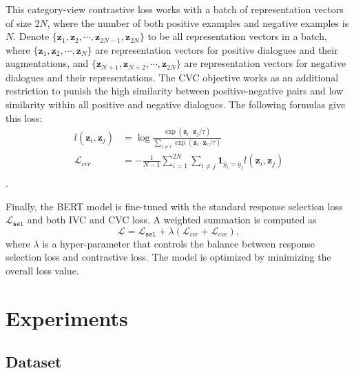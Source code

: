 \documentclass[letterpaper]{article} \usepackage{aaai22}  \usepackage{times}  \usepackage{helvet}  \usepackage{courier}  \usepackage[hyphens]{url}  \usepackage{graphicx} \urlstyle{rm} \def\UrlFont{\rm}  \usepackage{natbib}  \usepackage{caption} \DeclareCaptionStyle{ruled}{labelfont=normalfont,labelsep=colon,strut=off} \frenchspacing  \setlength{\pdfpagewidth}{8.5in}  \setlength{\pdfpageheight}{11in}  \usepackage{algorithm}
\begin{document}
This category-view contrastive loss works with a batch of representation vectors of size $2N$, where the number of both positive examples and negative examples is $N$. Denote $\{\mathbf{z}_1, \mathbf{z}_2, \cdots, \mathbf{z}_{2N-1}, \mathbf{z}_{2N}\}$ to be all representation vectors in a batch, where $\{\mathbf{z}_1, \mathbf{z}_2, \cdots, \mathbf{z}_N\}$ are representation vectors for positive dialogues and their augmentations, and $\{\mathbf{z}_{N+1}, \mathbf{z}_{N+2}, \cdots, \mathbf{z}_{2N}\}$ are representation vectors for negative dialogues and their representations. The CVC objective works as an additional restriction to punish the high similarity between positive-negative pairs and low similarity within all positive and negative dialogues. The following formulas give this loss:
\begin{equation}
    \begin{aligned}
    l(\mathbf{z}_i,\mathbf{z}_j) &= \log \frac{\exp (\mathbf{z}_i \cdot \mathbf{z}_j / \tau)}{\sum_{i \neq r} \exp (\mathbf{z}_i \cdot \mathbf{z}_r / \tau)} \\
    \mathcal{L}_{cvc} &= - \frac{1}{N-1} \sum_{i=1}^{2N} \sum_{i \neq j} \mathbf{1}_{\bar{y}_i=\bar{y}_j} l(\mathbf{z}_i,\mathbf{z}_j) \\
    \end{aligned}
\end{equation}.

Finally, the BERT model is fine-tuned with the standard response selection loss $\mathcal{L}_{\texttt{sel}}$ and both IVC and CVC loss. A weighted summation is computed as
\begin{equation}
    \mathcal{L} = \mathcal{L}_{\texttt{sel}} + \lambda (\mathcal{L}_{ivc} + \mathcal{L}_{cvc}),
\end{equation} where $\lambda$ is a hyper-parameter that controls the balance between response selection loss and contrastive loss. The model is optimized by minimizing the overall loss value.
 \section{Experiments}

\subsection{Dataset}
\end{document}
